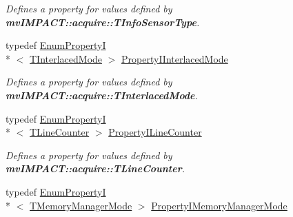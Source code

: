 \begin{DoxyCompactItemize}
\begin{DoxyCompactList}\small\item\em Defines a property for values defined by {\bfseries mv\+I\+M\+P\+A\+C\+T\+::acquire\+::\+T\+Info\+Sensor\+Type}. \end{DoxyCompactList}\item 
\hypertarget{group___device_specific_interface_gad01158960a8635ab8a2bd3199056045c}{typedef \hyperlink{classmv_i_m_p_a_c_t_1_1acquire_1_1_enum_property_i}{Enum\+Property\+I}\\*
$<$ \hyperlink{group___device_specific_interface_gafb928ff52f5c386fa1bac255d6850ff9}{T\+Interlaced\+Mode} $>$ \hyperlink{group___device_specific_interface_gad01158960a8635ab8a2bd3199056045c}{Property\+I\+Interlaced\+Mode}}\label{group___device_specific_interface_gad01158960a8635ab8a2bd3199056045c}

\begin{DoxyCompactList}\small\item\em Defines a property for values defined by {\bfseries mv\+I\+M\+P\+A\+C\+T\+::acquire\+::\+T\+Interlaced\+Mode}. \end{DoxyCompactList}\item 
\hypertarget{group___device_specific_interface_ga104cc83eecc5f80f03154860ac2068ff}{typedef \hyperlink{classmv_i_m_p_a_c_t_1_1acquire_1_1_enum_property_i}{Enum\+Property\+I}\\*
$<$ \hyperlink{group___device_specific_interface_gab9051a0d97eafeaff2951aa0196f14eb}{T\+Line\+Counter} $>$ \hyperlink{group___device_specific_interface_ga104cc83eecc5f80f03154860ac2068ff}{Property\+I\+Line\+Counter}}\label{group___device_specific_interface_ga104cc83eecc5f80f03154860ac2068ff}

\begin{DoxyCompactList}\small\item\em Defines a property for values defined by {\bfseries mv\+I\+M\+P\+A\+C\+T\+::acquire\+::\+T\+Line\+Counter}. \end{DoxyCompactList}\item 
\hypertarget{group___device_specific_interface_ga7c5c7c1188a4d20b4d61879c6597000d}{typedef \hyperlink{classmv_i_m_p_a_c_t_1_1acquire_1_1_enum_property_i}{Enum\+Property\+I}\\*
$<$ \hyperlink{group___common_interface_ga36f8c9739d1454dc75f980421ce5a6b6}{T\+Memory\+Manager\+Mode} $>$ \hyperlink{group___device_specific_interface_ga7c5c7c1188a4d20b4d61879c6597000d}{Property\+I\+Memory\+Manager\+Mode}}\label{group___device_specific_interface_ga7c5c7c1188a4d20b4d61879c6597000d}


\end{DoxyCompactItemize}
